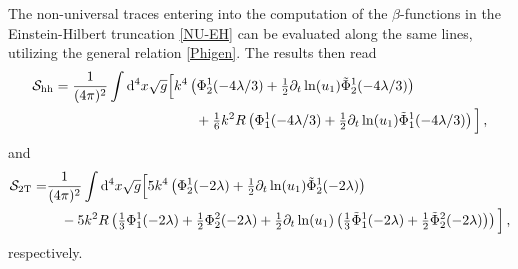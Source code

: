 \documentclass[preprint,preprintnumbers,amsmath,amssymb,nofootinbib,APS]{revtex4}
\newcommand{\be}{\begin{equation}}
\newcommand{\ee}{\end{equation}}
\newcommand{\cS}{\mathcal{S}}
\newcommand{\2}{\sqrt{2\,}}
\newcommand{\p}{\partial}
\newcommand{\rmd}{{\rm d}}
\begin{document}
\begin{appendix}
The non-universal traces entering into the computation of the $\beta$-functions in the Einstein-Hilbert truncation \eqref{NU-EH}
can be evaluated along the same lines, utilizing the general relation \eqref{Phigen}. The results then read
%
\be
\begin{split}
\cS_{\rm hh} =  \frac{1}{(4\pi)^2} \int \rmd^4x\sqrt{g} &
 \Big[ 
k^4 \left( \Phi^1_2(-4\lambda/3) + \tfrac{1}{2} \p_t \ln(u_1) \tilde{\Phi}^1_2(-4\lambda/3) \right) \\ & \qquad
 + \tfrac{1}{6} k^2 R \left( \Phi^1_1(-4\lambda/3) + \tfrac{1}{2} \p_t \ln(u_1) \tilde{\Phi}^1_1(-4\lambda/3) \right)
 \Big] \, ,
\end{split}
\ee
%
and
%
\be
\begin{split}
\cS_{\rm 2T} = & \frac{1}{(4\pi)^2} \int \rmd^4x\sqrt{g} 
\Big[ 
5 k^4 \left( \Phi^1_2(-2\lambda) + \tfrac{1}{2} \p_t \ln(u_1) \tilde{\Phi}^1_2(-2\lambda) \right) \\ & \quad
- 5 k^2 R \left( \tfrac{1}{3} \Phi^1_1(-2\lambda) + \tfrac{1}{2} \Phi^2_2(-2\lambda) 
+\tfrac{1}{2} \p_t \ln(u_1) \left( \tfrac{1}{3} \tilde{\Phi}^1_1(-2\lambda) + \tfrac{1}{2} \tilde{\Phi}^2_2(-2\lambda) \right)
\right)
\Big] \, , 
\end{split}
\ee
%
respectively.


\end{appendix}
\end{document}

